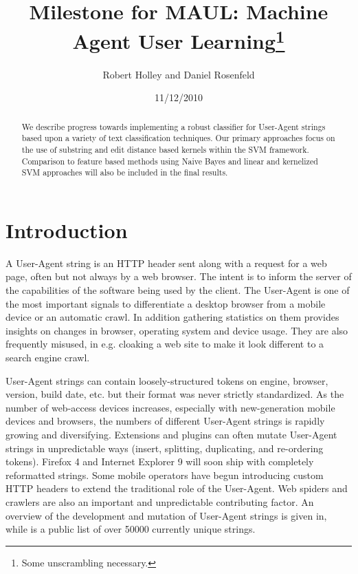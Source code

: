 \documentclass[10pt]{article}
\title{Milestone for MAUL: Machine Agent User Learning\footnote{Some unscrambling necessary.} }
\author{Robert Holley and Daniel Rosenfeld}
\date{11/12/2010}
\begin{document}
\maketitle
\begin{abstract}
We describe progress towards implementing a robust classifier for User-Agent strings based upon a variety of text classification techniques.  Our primary approaches focus on the use of substring and edit distance based kernels within the SVM framework.  Comparison to feature based methods using Naive Bayes and linear and kernelized SVM approaches will also be included in the final results. 
\end{abstract}


\section{Introduction}
A User-Agent string is an HTTP header sent along with a request for a web page, often but not always by a web browser.\cite{httprfc} The intent is to inform the server
of the capabilities of the software being used by the client. The User-Agent is
one of the most important signals to differentiate a desktop browser from a
mobile device or an automatic crawl. In addition gathering statistics on them
provides insights on changes in browser, operating system and device usage. They
are also frequently misused, in e.g. cloaking a web site to make it look
different to a search engine crawl.

User-Agent strings can contain loosely-structured tokens on engine, browser,
version, build date, etc. but their format was never strictly standardized.\cite{httprfc}
As the number of web-access devices increases, especially with new-generation
mobile devices and browsers, the numbers of different User-Agent strings is
rapidly growing and diversifying. Extensions and plugins can often mutate
User-Agent strings in unpredictable ways (insert, splitting, duplicating, and
re-ordering tokens). Firefox 4 and Internet Explorer 9 will soon ship with
completely reformatted strings. Some mobile operators have begun introducing
custom HTTP headers to extend the traditional role of the User-Agent.\cite{mobile} Web spiders and crawlers are also an important and unpredictable contributing factor.
An overview of the development and mutation of User-Agent strings is given in,\cite{history} while \cite{uatracker} is a public list of over 50000 currently unique strings.
\end{document}
